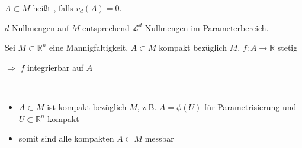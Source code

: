 \begin{*definition}
	$A\subset M$ heißt , falls $v_d(A) = 0$.
\end{*definition}
\begin{underlinedenvironment}[beachte]
	$d$-Nullmengen auf $M$ entsprechend $\mathcal{L}^d$-Nullmengen im Parameterbereich.
\end{underlinedenvironment}

\begin{proposition}
	Sei $M\subset\mathbb{R}^n$ eine Mannigfaltigkeit, $A\subset M$ kompakt bezüglich $M$, $f\colon A\to\mathbb{R}$ stetig
	
	\hspace*{0.5em}$\Rightarrow$ $f$ integrierbar auf $A$
\end{proposition}

\begin{underlinedenvironment}[Hinweis]
	\ \\
	\vspace{-1.5\baselineskip}
	\begin{itemize}
		\item $A\subset M$ ist kompakt bezüglich $M$, z.B. $A = \phi(U)$ für Parametrisierung und $U\subset\mathbb{R}^n$ kompakt
		\item somit sind alle kompakten $A\subset M$ messbar
	\end{itemize}
\end{underlinedenvironment}

